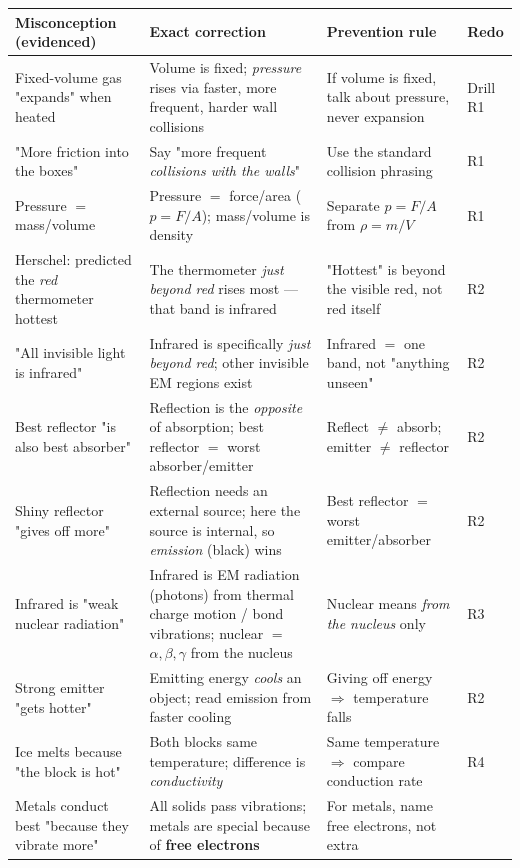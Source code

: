 \documentclass[11pt,a4paper]{article}
\begin{document}
\renewcommand{\arraystretch}{1.35}
\begin{longtable}{@{}p{3.5cm}p{4.4cm}p{4.2cm}p{2.6cm}@{}}
\toprule
\textbf{Misconception (evidenced)} & \textbf{Exact correction} & \textbf{Prevention rule} &
\textbf{Redo} \\
\midrule
\endhead
Fixed-volume gas "expands" when heated & Volume is fixed; \emph{pressure} rises via faster,
more frequent, harder wall collisions & If volume is fixed, talk about pressure, never
expansion & Drill R1 \\
"More friction into the boxes" & Say "more frequent \emph{collisions with the walls}" &
Use the standard collision phrasing & R1 \\
Pressure $=$ mass/volume & Pressure $=$ force/area ($p=F/A$); mass/volume is density &
Separate $p=F/A$ from $\rho=m/V$ & R1 \\
Herschel: predicted the \emph{red} thermometer hottest & The thermometer \emph{just beyond
red} rises most --- that band is infrared & "Hottest" is beyond the visible red, not red
itself & R2 \\
"All invisible light is infrared" & Infrared is specifically \emph{just beyond red}; other
invisible EM regions exist & Infrared $=$ one band, not "anything unseen" & R2 \\
Best reflector "is also best absorber" & Reflection is the \emph{opposite} of absorption;
best reflector $=$ worst absorber/emitter & Reflect $\ne$ absorb; emitter $\ne$ reflector &
R2 \\
Shiny reflector "gives off more" & Reflection needs an external source; here the source is
internal, so \emph{emission} (black) wins & Best reflector $=$ worst emitter/absorber &
R2 \\
Infrared is "weak nuclear radiation" & Infrared is EM radiation (photons) from thermal
charge motion / bond vibrations; nuclear $=$ $\alpha,\beta,\gamma$ from the nucleus &
Nuclear means \emph{from the nucleus} only & R3 \\
Strong emitter "gets hotter" & Emitting energy \emph{cools} an object; read emission from
faster cooling & Giving off energy $\Rightarrow$ temperature falls & R2 \\
Ice melts because "the block is hot" & Both blocks same temperature; difference is
\emph{conductivity} & Same temperature $\Rightarrow$ compare conduction rate & R4 \\
Metals conduct best "because they vibrate more" & All solids pass vibrations; metals are
special because of \textbf{free electrons} & For metals, name free electrons, not extra

\end{longtable}
\end{document}
